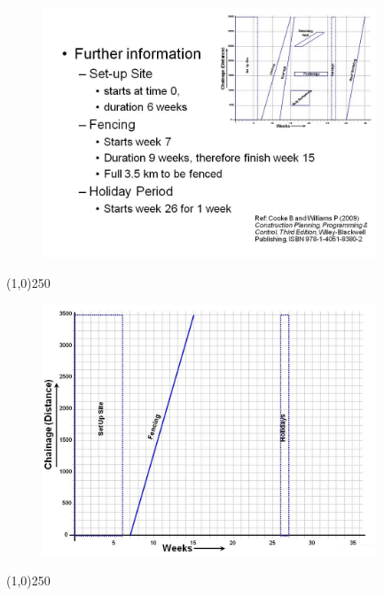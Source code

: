 \begin{frame}
\begin{figure}
	\centering
		\includegraphics[width = 10.0cm]{oldnotes/Slide305.jpg}
\end{figure}
\end{frame}
\begin{center}\line(1,0){250}\end{center}




\begin{frame}
\begin{figure}
	\centering
		\includegraphics[width = 10.0cm]{oldnotes/Slide306.jpg}
\end{figure}
\end{frame}
\begin{center}\line(1,0){250}\end{center}




